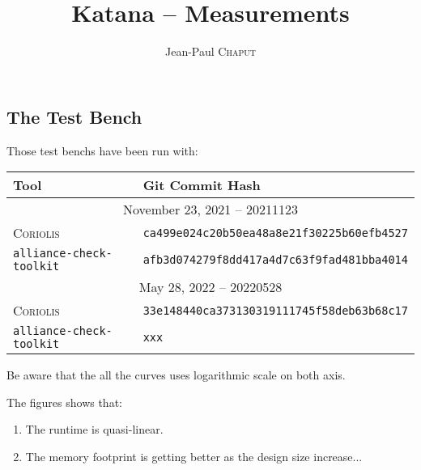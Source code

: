 \documentclass[11pt]{article}
\newcommand {\Chaput} {\textsc{Chaput}\xspace}
\begin{document}
   

   \title{Katana -- Measurements}
   \author{Jean-Paul \Chaput}

   \maketitle

   \thispagestyle{fancy}

   \subsection*{The Test Bench}

   Those test benchs have been run with:

   \begin{tabular}{|l|l|}
      \hline
      \textbf{Tool}                   & \textbf{Git Commit Hash} \\
      \hline
      \multicolumn{2}{|c|}{November 23, 2021 -- 20211123} \\
      \hline
      \textsc{Coriolis}               & \texttt{ca499e024c20b50ea48a8e21f30225b60efb4527} \\
      \texttt{alliance-check-toolkit} & \texttt{afb3d074279f8dd417a4d7c63f9fad481bba4014} \\
      \hline
      \multicolumn{2}{|c|}{May 28, 2022 -- 20220528} \\
      \hline
      \textsc{Coriolis}               & \texttt{33e148440ca373130319111745f58deb63b68c17} \\
      \texttt{alliance-check-toolkit} & \texttt{xxx} \\
      \hline
   \end{tabular}


   Be aware that the all the curves uses logarithmic scale on both axis.

   The figures shows that:
   \begin{enumerate}
     \item The runtime is quasi-linear.
     \item The memory footprint is getting better as the design size
           increase...
   \end{enumerate}


   \begin{center}
   \end{center}
   \begin{center}
   \end{center}
\end{document}
